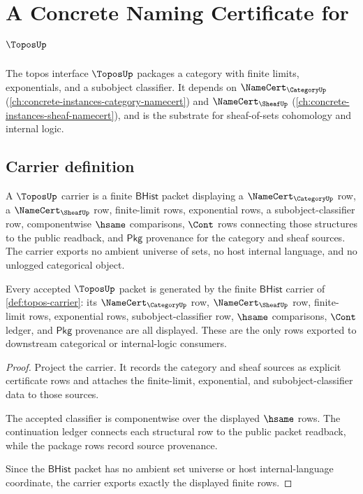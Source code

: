 \chapter{A Concrete Naming Certificate for $\ToposUp$}
\label{ch:concrete-instances-topos-namecert}

The topos interface $\ToposUp$ packages a category with finite limits, exponentials, and a subobject classifier. It depends on $\NameCert_{\CategoryUp}$ (\autoref{ch:concrete-instances-category-namecert}) and $\NameCert_{\SheafUp}$ (\autoref{ch:concrete-instances-sheaf-namecert}), and is the substrate for sheaf-of-sets cohomology and internal logic.

\section{Carrier definition}
\label{sec:topos-carrier}

\begin{definition}
\label{def:topos-carrier}
A $\ToposUp$ carrier is a finite $\mathsf{BHist}$ packet displaying a $\NameCert_{\CategoryUp}$ row, a $\NameCert_{\SheafUp}$ row, finite-limit rows, exponential rows, a subobject-classifier row, componentwise $\hsame$ comparisons, $\Cont$ rows connecting those structures to the public readback, and $\mathsf{Pkg}$ provenance for the category and sheaf sources. The carrier exports no ambient universe of sets, no host internal language, and no unlogged categorical object.
\end{definition}

\begin{theorem}
\label{thm:topos-carrier-obligation}
Every accepted $\ToposUp$ packet is generated by the finite $\mathsf{BHist}$ carrier of \autoref{def:topos-carrier}: its $\NameCert_{\CategoryUp}$ row, $\NameCert_{\SheafUp}$ row, finite-limit rows, exponential rows, subobject-classifier row, $\hsame$ comparisons, $\Cont$ ledger, and $\mathsf{Pkg}$ provenance are all displayed. These are the only rows exported to downstream categorical or internal-logic consumers.
\end{theorem}
\begin{proof}
Project the carrier. It records the category and sheaf sources as explicit certificate rows and attaches the finite-limit, exponential, and subobject-classifier data to those sources.

The accepted classifier is componentwise over the displayed $\hsame$ rows. The continuation ledger connects each structural row to the public packet readback, while the package rows record source provenance.

Since the $\mathsf{BHist}$ packet has no ambient set universe or host internal-language coordinate, the carrier exports exactly the displayed finite rows.
\end{proof}

